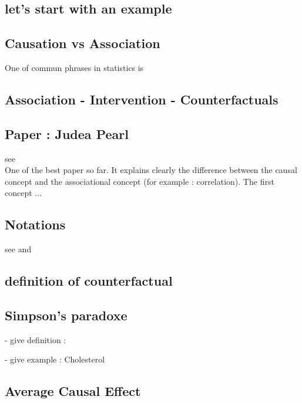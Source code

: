 \documentclass{article}
\begin{document}
\subsection{let's start with an example}

\subsection{Causation vs Association}
\cite{pearl2019seven} \cite{hernan2020causal}  \cite{pearl2010mathematics} One of commun phrases in statistics is 

\subsection{Association - Intervention - Counterfactuals}

 \cite{pearl2019seven} 

\subsection{Paper : Judea Pearl}

see \cite{pearl2010mathematics} \\
One of the best paper so far. It explains clearly the difference between the causal concept and the associational concept (for example : correlation). The first concept ...




\subsection{Notations}
see \cite{yao2020survey} and \cite{hernan2020causal}

\subsection{definition of counterfactual}

\subsection{Simpson's paradoxe}

- give definition :

- give example : Cholesterol  

\subsection{Average Causal Effect}
\end{document}
